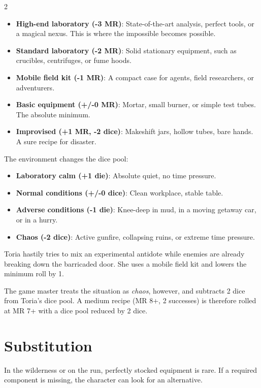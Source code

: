 \begin{multicols}{2}
\begin{itemize}
    \item \textbf{High-end laboratory (-3 MR)}: State-of-the-art analysis, perfect tools, or a magical nexus. This is where the impossible becomes possible.
    \item \textbf{Standard laboratory (-2 MR)}: Solid stationary equipment, such as crucibles, centrifuges, or fume hoods.
    \item \textbf{Mobile field kit (-1 MR)}: A compact case for agents, field researchers, or adventurers.
    \item \textbf{Basic equipment (+/-0 MR)}: Mortar, small burner, or simple test tubes. The absolute minimum.
    \item \textbf{Improvised (+1 MR, -2 dice)}: Makeshift jars, hollow tubes, bare hands. A sure recipe for disaster.
\end{itemize}

The environment changes the dice pool:
\begin{itemize}
    \item \textbf{Laboratory calm (+1 die)}: Absolute quiet, no time pressure.
    \item \textbf{Normal conditions (+/-0 dice)}: Clean workplace, stable table.
    \item \textbf{Adverse conditions (-1 die)}: Knee-deep in mud, in a moving getaway car, or in a hurry.
    \item \textbf{Chaos (-2 dice)}: Active gunfire, collapsing ruins, or extreme time pressure.
\end{itemize}

\begin{pexample}[Example]
Toria hastily tries to mix an experimental antidote while enemies are already breaking down the barricaded door. She uses a mobile field kit and lowers the minimum roll by 1.

The game master treats the situation as \textit{chaos}, however, and subtracts 2 dice from Toria's dice pool. A medium recipe (MR 8+, 2 successes) is therefore rolled at MR 7+ with a dice pool reduced by 2 dice.
\end{pexample}

\section{Substitution}

In the wilderness or on the run, perfectly stocked equipment is rare. If a required component is missing, the character can look for an alternative.


\end{multicols}
